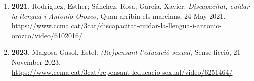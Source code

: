 \begin{enumerate}
\item {\bf 2021}. Rodríguez, Esther; Sánchez, Rosa; García, Xavier. {\it Discapacitat, cuidar la llengua i Antonio Orozco}, Quan arribin els marcians, 24 May 2021. \\ \url{ https://www.ccma.cat/3cat/discapacitat-cuidar-la-llengua-i-antonio-orozco/video/6102016/ }\filbreak
\item {\bf 2023}. Malgosa Gasol, Estel. {\it (Re)pensant l'educació sexual}, Sense ficció, 21 November 2023. \\ \url{ https://www.ccma.cat/3cat/repensant-leducacio-sexual/video/6251464/ }\filbreak
\end{enumerate} 
